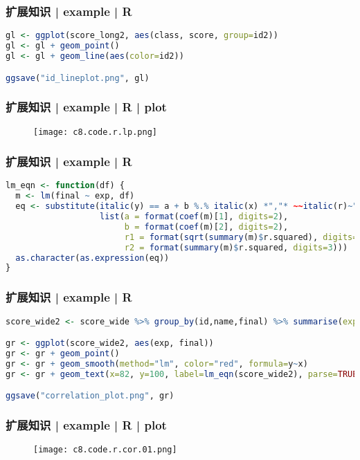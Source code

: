 \begin{frame}[fragile]
  \frametitle{扩展知识 | example | R}
\begin{lstlisting}[language=r]
gl <- ggplot(score_long2, aes(class, score, group=id2))
gl <- gl + geom_point()
gl <- gl + geom_line(aes(color=id2))

ggsave("id_lineplot.png", gl)
\end{lstlisting}
\end{frame}

\begin{frame}
  \frametitle{扩展知识 | example | R | plot}
  \begin{figure}
    \centering
    \texttt{[image: c8.code.r.lp.png]}
  \end{figure}
\end{frame}

\begin{frame}[fragile]
  \frametitle{扩展知识 | example | R}
\begin{lstlisting}[language=r]
lm_eqn <- function(df) {
  m <- lm(final ~ exp, df)
  eq <- substitute(italic(y) == a + b %.% italic(x) *","* ~~italic(r)~"="~r1 *","* ~~italic(R)^2~"="~r2, 
                   list(a = format(coef(m)[1], digits=2), 
                        b = format(coef(m)[2], digits=2), 
                        r1 = format(sqrt(summary(m)$r.squared), digits=3),
                        r2 = format(summary(m)$r.squared, digits=3)))
  as.character(as.expression(eq))
}
\end{lstlisting}
\end{frame}

\begin{frame}[fragile]
  \frametitle{扩展知识 | example | R}
\begin{lstlisting}[language=r]
score_wide2 <- score_wide %>% group_by(id,name,final) %>% summarise(exp=mean(c(e6,e7,e8,e9))) 

gr <- ggplot(score_wide2, aes(exp, final))
gr <- gr + geom_point()
gr <- gr + geom_smooth(method="lm", color="red", formula=y~x)
gr <- gr + geom_text(x=82, y=100, label=lm_eqn(score_wide2), parse=TRUE, size=5, color="blue")

ggsave("correlation_plot.png", gr)
\end{lstlisting}
\end{frame}

\begin{frame}
  \frametitle{扩展知识 | example | R | plot}
  \begin{figure}
    \centering
    \texttt{[image: c8.code.r.cor.01.png]}
  \end{figure}
\end{frame}

